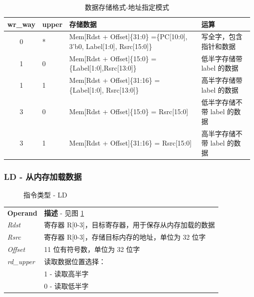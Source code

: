 \documentclass[main\_\_CN.tex]{subfiles}
\begin{document}
\begin{table}[H]
    \centering
    \begin{tabular}{ c l l l }
    \textbf{wr\_way}  & \textbf{upper} & \textbf{存储数据} & \textbf{运算}  \\ \hline
    0 &*&Mem[Rdst + Offset]\{31:0\} =\{PC[10:0], 3'b0, Label[1:0], Rsrc[15:0]\}  & 写全字，包含指针和数据 \\
    1 & 0 & Mem[Rdst + Offset]\{15:0\}  = \{Label[1:0],Rsrc[13:0]\} & 低半字存储带 label 的数据\\
    1 & 1 & Mem[Rdst + Offset]\{31:16\} = \{Label[1:0], Rsrc[13:0]\} & 高半字存储带 label 的数据\\
    3 & 0 & Mem[Rdst + Offset]\{15:0\} = Rsrc[15:0] &低半字存储不带 label 的数据  \\
    3 & 1 & Mem[Rdst + Offset]\{31:16\} = Rsrc[15:0]& 高半字存储不带 label 的数据  \\
    \end{tabular}
    \caption{数据存储格式-地址指定模式}
    \label{tab:data_format-with-write_way}
\end{table}

\subsubsection{LD - 从内存加载数据}

%
%
%
%
%
%
%
\begin{figure}[H]
    \centering
    \caption{指令类型 - LD}
    \label{fig:LD}
\end{figure}

\vspace{-2em}
\begin{tabular}{ l l }
\textbf{Operand} & \textbf{描述} - 见图 \ref{fig:LD} \\
\textit{Rdst} & 寄存器 R[0-3]，目标寄存器，用于保存从内存加载的数据\\
\textit{Rsrc} & 寄存器 R[0-3]，存储目标内存的地址，单位为 32 位字 \\
\textit{Offset} & 11 位有符号数，单位为 32 位字 \\
\textit{rd\_upper} & 读取数据位置选择： \\
 & 1 - 读取高半字\\
 & 0 - 读取低半字
\end{tabular}
\end{document}
